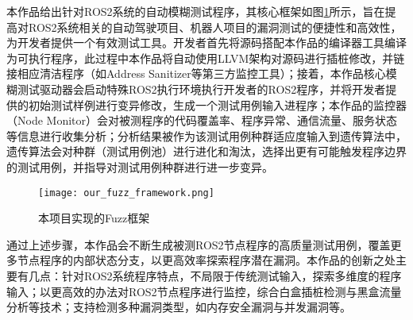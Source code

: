 本作品给出针对ROS2系统的自动模糊测试程序，其核心框架如图\ref{pic:off}所示，旨在提高对ROS2系统相关的自动驾驶项目、机器人项目的漏洞测试的便捷性和高效性，为开发者提供一个有效测试工具。开发者首先将源码搭配本作品的编译器工具编译为可执行程序，此过程中本作品将自动使用LLVM架构对源码进行插桩修改，并链接相应清洁程序（如Address Sanitizer等第三方监控工具）；接着，本作品核心模糊测试驱动器会启动特殊ROS2执行环境执行开发者的ROS2程序，并将开发者提供的初始测试样例进行变异修改，生成一个测试用例输入进程序；本作品的监控器（Node Monitor）会对被测程序的代码覆盖率、程序异常、通信流量、服务状态等信息进行收集分析；分析结果被作为该测试用例种群适应度输入到遗传算法中，遗传算法会对种群（测试用例池）进行进化和淘汰，选择出更有可能触发程序边界的测试用例，并指导对测试用例种群进行进一步变异。

\begin{figure}[H]
    \centering
    \texttt{[image: our\_fuzz\_framework.png]}
    \caption{本项目实现的Fuzz框架}
    \label{pic:off}
\end{figure}

通过上述步骤，本作品会不断生成被测ROS2节点程序的高质量测试用例，覆盖更多节点程序的内部状态分支，以更高效率探索程序潜在漏洞。本作品的创新之处主要有几点：针对ROS2系统程序特点，不局限于传统测试输入，探索多维度的程序输入；以更高效的办法对ROS2节点程序进行监控，综合白盒插桩检测与黑盒流量分析等技术；支持检测多种漏洞类型，如内存安全漏洞与并发漏洞等。

